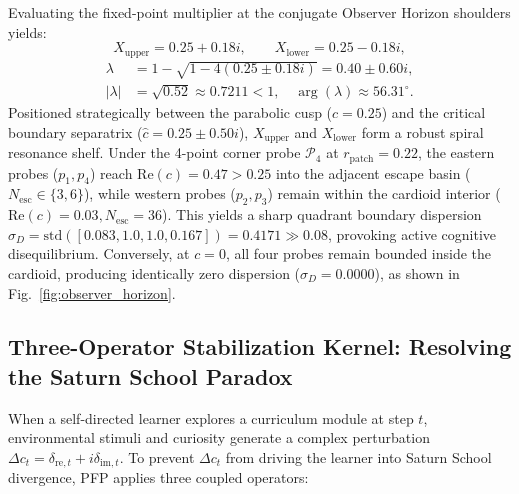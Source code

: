 \documentclass[10pt,twocolumn,a4paper]{article}
\begin{document}
Evaluating the fixed-point multiplier at the conjugate Observer Horizon shoulders yields:
\begin{equation}
    X_{\text{upper}} = 0.25 + 0.18i, \qquad X_{\text{lower}} = 0.25 - 0.18i,
    \label{eq:shoulders}
\end{equation}
\begin{align}
    \lambda &= 1 - \sqrt{1 - 4(0.25 \pm 0.18i)} = 0.40 \pm 0.60i, \label{eq:lambda_shoulder} \\
    |\lambda| &= \sqrt{0.52} \approx 0.7211 < 1, \quad \arg(\lambda) \approx 56.31^\circ. \nonumber
\end{align}
Positioned strategically between the parabolic cusp ($c = 0.25$) and the critical boundary separatrix ($\hat{c} = 0.25 \pm 0.50i$), $X_{\text{upper}}$ and $X_{\text{lower}}$ form a robust spiral resonance shelf. Under the 4-point corner probe $\mathcal{P}_4$ at $r_{\text{patch}} = 0.22$, the eastern probes ($p_1, p_4$) reach $\text{Re}(c) = 0.47 > 0.25$ into the adjacent escape basin ($N_{\text{esc}} \in \{3, 6\}$), while western probes ($p_2, p_3$) remain within the cardioid interior ($\text{Re}(c) = 0.03, N_{\text{esc}} = 36$). This yields a sharp quadrant boundary dispersion $\sigma_D = \text{std}([0.083, 1.0, 1.0, 0.167]) = 0.4171 \gg 0.08$, provoking active cognitive disequilibrium. Conversely, at $c = 0$, all four probes remain bounded inside the cardioid, producing identically zero dispersion ($\sigma_D = 0.0000$), as shown in Fig.~\ref{fig:observer_horizon}.


\subsection{Three-Operator Stabilization Kernel: Resolving the Saturn School Paradox}
When a self-directed learner explores a curriculum module at step $t$, environmental stimuli and curiosity generate a complex perturbation $\Delta c_t = \delta_{\text{re},t} + i\delta_{\text{im},t}$. To prevent $\Delta c_t$ from driving the learner into Saturn School divergence, PFP applies three coupled operators:
\end{document}
